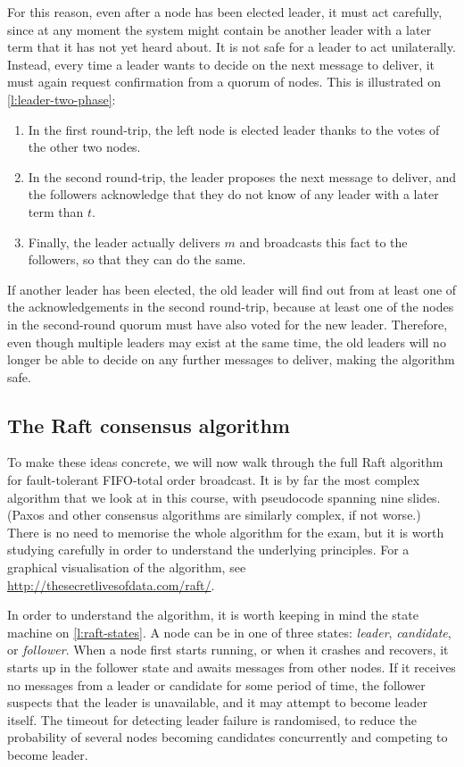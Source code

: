 For this reason, even after a node has been elected leader, it must act carefully, since at any moment the system might contain be another leader with a later term that it has not yet heard about.
It is not safe for a leader to act unilaterally.
Instead, every time a leader wants to decide on the next message to deliver, it must again request confirmation from a quorum of nodes.
This is illustrated on \autoref{l:leader-two-phase}:
\begin{enumerate}
    \item In the first round-trip, the left node is elected leader thanks to the votes of the other two nodes.
    \item In the second round-trip, the leader proposes the next message to deliver, and the followers acknowledge that they do not know of any leader with a later term than $t$.
    \item Finally, the leader actually delivers $m$ and broadcasts this fact to the followers, so that they can do the same.
\end{enumerate}
If another leader has been elected, the old leader will find out from at least one of the acknowledgements in the second round-trip, because at least one of the nodes in the second-round quorum must have also voted for the new leader.
Therefore, even though multiple leaders may exist at the same time, the old leaders will no longer be able to decide on any further messages to deliver, making the algorithm safe.

\subsection{The Raft consensus algorithm}

To make these ideas concrete, we will now walk through the full Raft algorithm for fault-tolerant FIFO-total order broadcast.
It is by far the most complex algorithm that we look at in this course, with pseudocode spanning nine slides.
(Paxos and other consensus algorithms are similarly complex, if not worse.)
There is no need to memorise the whole algorithm for the exam, but it is worth studying carefully in order to understand the underlying principles.
For a graphical visualisation of the algorithm, see \url{http://thesecretlivesofdata.com/raft/}.

In order to understand the algorithm, it is worth keeping in mind the state machine on \autoref{l:raft-states}.
A node can be in one of three states: \emph{leader}, \emph{candidate}, or \emph{follower}.
When a node first starts running, or when it crashes and recovers, it starts up in the follower state and awaits messages from other nodes.
If it receives no messages from a leader or candidate for some period of time, the follower suspects that the leader is unavailable, and it may attempt to become leader itself.
The timeout for detecting leader failure is randomised, to reduce the probability of several nodes becoming candidates concurrently and competing to become leader.

